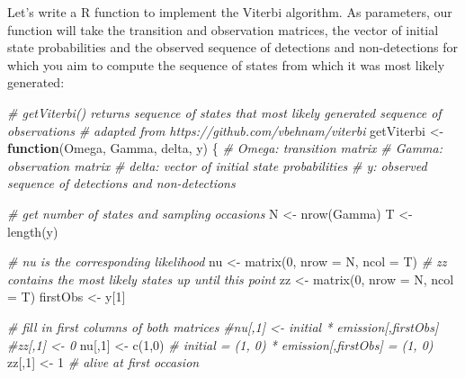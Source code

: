 \documentclass[
  12pt,
]{krantz}
\newenvironment{Shaded}{\begin{snugshade}}{\end{snugshade}}
\newcommand{\AttributeTok}[1]{\textcolor[rgb]{0.77,0.63,0.00}{#1}}
\newcommand{\CommentTok}[1]{\textcolor[rgb]{0.56,0.35,0.01}{\textit{#1}}}
\newcommand{\ControlFlowTok}[1]{\textcolor[rgb]{0.13,0.29,0.53}{\textbf{#1}}}
\newcommand{\DecValTok}[1]{\textcolor[rgb]{0.00,0.00,0.81}{#1}}
\newcommand{\FunctionTok}[1]{\textcolor[rgb]{0.00,0.00,0.00}{#1}}
\newcommand{\NormalTok}[1]{#1}
\newcommand{\OtherTok}[1]{\textcolor[rgb]{0.56,0.35,0.01}{#1}}
\begin{document}
Let's write a R function to implement the Viterbi algorithm. As parameters, our function will take the transition and observation matrices, the vector of initial state probabilities and the observed sequence of detections and non-detections for which you aim to compute the sequence of states from which it was most likely generated:

\begin{Shaded}
\begin{Highlighting}[]
\CommentTok{\# getViterbi() returns sequence of states that most likely generated sequence of observations}
\CommentTok{\# adapted from https://github.com/vbehnam/viterbi}
\NormalTok{getViterbi }\OtherTok{\textless{}{-}} \ControlFlowTok{function}\NormalTok{(Omega, Gamma, delta, y) \{}
\CommentTok{\# Omega: transition matrix}
\CommentTok{\# Gamma: observation matrix}
\CommentTok{\# delta: vector of initial state probabilities}
\CommentTok{\# y: observed sequence of detections and non{-}detections}
  
\CommentTok{\# get number of states and sampling occasions}
\NormalTok{N }\OtherTok{\textless{}{-}} \FunctionTok{nrow}\NormalTok{(Gamma)}
\NormalTok{T }\OtherTok{\textless{}{-}} \FunctionTok{length}\NormalTok{(y)}
  
\CommentTok{\# nu is the corresponding likelihood}
\NormalTok{nu }\OtherTok{\textless{}{-}} \FunctionTok{matrix}\NormalTok{(}\DecValTok{0}\NormalTok{, }\AttributeTok{nrow =}\NormalTok{ N, }\AttributeTok{ncol =}\NormalTok{ T)}
\CommentTok{\# zz contains the most likely states up until this point}
\NormalTok{zz }\OtherTok{\textless{}{-}} \FunctionTok{matrix}\NormalTok{(}\DecValTok{0}\NormalTok{, }\AttributeTok{nrow =}\NormalTok{ N, }\AttributeTok{ncol =}\NormalTok{ T)}
\NormalTok{firstObs }\OtherTok{\textless{}{-}}\NormalTok{ y[}\DecValTok{1}\NormalTok{]}
  
\CommentTok{\# fill in first columns of both matrices}
\CommentTok{\#nu[,1] \textless{}{-} initial * emission[,firstObs]}
\CommentTok{\#zz[,1] \textless{}{-} 0}
\NormalTok{nu[,}\DecValTok{1}\NormalTok{] }\OtherTok{\textless{}{-}} \FunctionTok{c}\NormalTok{(}\DecValTok{1}\NormalTok{,}\DecValTok{0}\NormalTok{) }\CommentTok{\# initial = (1, 0) * emission[,firstObs] = (1, 0)}
\NormalTok{zz[,}\DecValTok{1}\NormalTok{] }\OtherTok{\textless{}{-}} \DecValTok{1} \CommentTok{\# alive at first occasion}


\end{Highlighting}
\end{Shaded}
\end{document}
